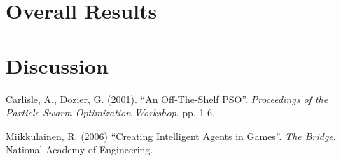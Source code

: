 \documentclass[12pt]{article}
\begin{document}
\section{Overall Results}

\section{Discussion}


\begin{thebibliography}{99}

 Carlisle, A., Dozier, G. (2001). ``An Off-The-Shelf PSO''.
  {\it Proceedings of the Particle Swarm Optimization Workshop}. pp. 1-6. 

 Miikkulainen, R. (2006) ``Creating Intelligent
  Agents in Games''.  {\it The Bridge}.  National Academy of Engineering.

\end{thebibliography}
\end{document}
